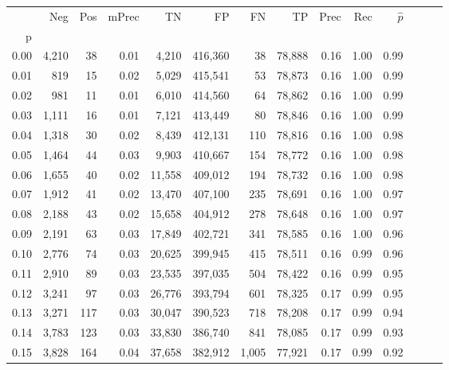 \begin{tabular}{rrrrrrrrrrrrrr}
\toprule
{} &    Neg &    Pos & mPrec &       TN &       FP &      FN &      TP &  Prec &   Rec & $\hat{p}$ \\
p    &        &        &       &          &          &         &         &       &       &           \\
\midrule
0.00 &  4,210 &     38 &  0.01 &    4,210 &  416,360 &      38 &  78,888 &  0.16 &  1.00 &      0.99 \\
0.01 &    819 &     15 &  0.02 &    5,029 &  415,541 &      53 &  78,873 &  0.16 &  1.00 &      0.99 \\
0.02 &    981 &     11 &  0.01 &    6,010 &  414,560 &      64 &  78,862 &  0.16 &  1.00 &      0.99 \\
0.03 &  1,111 &     16 &  0.01 &    7,121 &  413,449 &      80 &  78,846 &  0.16 &  1.00 &      0.99 \\
0.04 &  1,318 &     30 &  0.02 &    8,439 &  412,131 &     110 &  78,816 &  0.16 &  1.00 &      0.98 \\
0.05 &  1,464 &     44 &  0.03 &    9,903 &  410,667 &     154 &  78,772 &  0.16 &  1.00 &      0.98 \\
0.06 &  1,655 &     40 &  0.02 &   11,558 &  409,012 &     194 &  78,732 &  0.16 &  1.00 &      0.98 \\
0.07 &  1,912 &     41 &  0.02 &   13,470 &  407,100 &     235 &  78,691 &  0.16 &  1.00 &      0.97 \\
0.08 &  2,188 &     43 &  0.02 &   15,658 &  404,912 &     278 &  78,648 &  0.16 &  1.00 &      0.97 \\
0.09 &  2,191 &     63 &  0.03 &   17,849 &  402,721 &     341 &  78,585 &  0.16 &  1.00 &      0.96 \\
0.10 &  2,776 &     74 &  0.03 &   20,625 &  399,945 &     415 &  78,511 &  0.16 &  0.99 &      0.96 \\
0.11 &  2,910 &     89 &  0.03 &   23,535 &  397,035 &     504 &  78,422 &  0.16 &  0.99 &      0.95 \\
0.12 &  3,241 &     97 &  0.03 &   26,776 &  393,794 &     601 &  78,325 &  0.17 &  0.99 &      0.95 \\
0.13 &  3,271 &    117 &  0.03 &   30,047 &  390,523 &     718 &  78,208 &  0.17 &  0.99 &      0.94 \\
0.14 &  3,783 &    123 &  0.03 &   33,830 &  386,740 &     841 &  78,085 &  0.17 &  0.99 &      0.93 \\
0.15 &  3,828 &    164 &  0.04 &   37,658 &  382,912 &   1,005 &  77,921 &  0.17 &  0.99 &      0.92 \\

\end{tabular}
